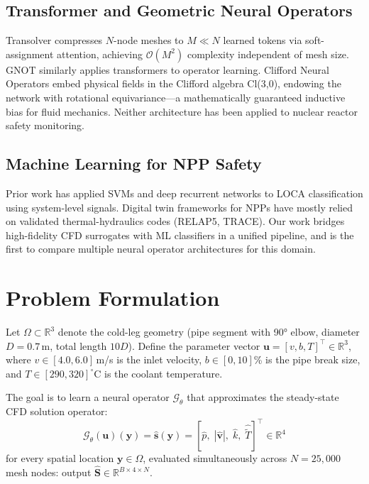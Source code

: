 \documentclass[conference]{IEEEtran}
\begin{document}
\subsection{Transformer and Geometric Neural Operators}
Transolver \cite{wu2024transolver} compresses $N$-node meshes to $M \ll N$ learned tokens via soft-assignment attention, achieving $\mathcal{O}(M^2)$ complexity independent of mesh size. GNOT \cite{hao2023gnot} similarly applies transformers to operator learning. Clifford Neural Operators \cite{brandstetter2023clifford} embed physical fields in the Clifford algebra Cl(3,0), endowing the network with rotational equivariance---a mathematically guaranteed inductive bias for fluid mechanics. Neither architecture has been applied to nuclear reactor safety monitoring.

\subsection{Machine Learning for NPP Safety}
Prior work has applied SVMs \cite{song2018} and deep recurrent networks \cite{choi2019} to LOCA classification using system-level signals. Digital twin frameworks for NPPs \cite{grieves2014, liu2022npp} have mostly relied on validated thermal-hydraulics codes (RELAP5, TRACE). Our work bridges high-fidelity CFD surrogates with ML classifiers in a unified pipeline, and is the first to compare multiple neural operator architectures for this domain.

\section{Problem Formulation}
\label{sec:problem}

Let $\Omega \subset \mathbb{R}^3$ denote the cold-leg geometry (pipe segment with 90° elbow, diameter $D = 0.7$\,m, total length $10D$). Define the parameter vector $\bm{u} = [v, b, T]^\top \in \mathbb{R}^3$, where $v \in [4.0, 6.0]$\,m/s is the inlet velocity, $b \in [0, 10]$\% is the pipe break size, and $T \in [290, 320]^\circ$C is the coolant temperature.

The goal is to learn a neural operator $\mathcal{G}_\theta$ that approximates the steady-state CFD solution operator:
\begin{equation}
\mathcal{G}_\theta(\bm{u})(\bm{y}) = \hat{\bm{s}}(\bm{y}) = [\hat{p},\; |\hat{\bm{v}}|,\; \hat{k},\; \hat{\tilde{T}}]^\top \in \mathbb{R}^4
\label{eq:operator}
\end{equation}
for every spatial location $\bm{y} \in \Omega$, evaluated simultaneously across $N = 25{,}000$ mesh nodes: output $\hat{\bm{S}} \in \mathbb{R}^{B \times 4 \times N}$.
\end{document}
